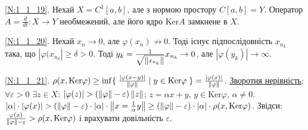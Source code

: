 \noindent\ref{N:1_1_19}. Нехай $X = C^1[a,b]$, але з нормою простору $C[a,b]=Y$.
Оператор $A = \frac{d}{dt}: X \to Y$ необмежений, але його ядро $\mathrm{Ker}A$
замкнене в $X$.

\noindent\ref{N:1_1_20}. Нехай $x_n \to 0$, але $\varphi(x_n) \not\to 0$.
Тоді існує підпослідовність $x_{n_k}$ така, що $|\varphi(x_{n_k}| \geq \delta > 0$.
Тоді $y_k = \frac{1}{\sqrt{\left\lVert x_{n_k}\right\rVert}} x_{n_k} \to 0$, але $|\varphi(y_k)|\to\infty$.

\noindent\ref{N:1_1_21}. $\rho(x,\mathrm{Ker}\varphi) \geq \inf
\{\; \frac{ |\varphi(x-y)| }{ \left\lVert\varphi\right\rVert } \mid y \in \mathrm{Ker}\varphi \;\} = 
\frac{|\varphi(x)|}{\left\lVert\varphi\right\rVert}$.
\uline{Зворотня нерівність}: $\forall\varepsilon > 0$ $\exists z \in X$:
$|\varphi(z)| > (\left\lVert\varphi\right\rVert - \varepsilon)\left\lVert z\right\rVert$;
$z = \alpha x + y$, $y \in \mathrm{Ker}\varphi$, $\alpha \neq 0$.
$|\alpha| \cdot |\varphi(x)|
> (\left\lVert\varphi\right\rVert - \varepsilon)\cdot|\alpha|\cdot\left\lVert x = \frac{1}{\alpha}y\right\rVert
\geq (\left\lVert\varphi\right\rVert - \varepsilon)\cdot|\alpha|\cdot\rho(x,\mathrm{Ker}\varphi)$.
Звідси: $\frac{\varphi(x)}{\left\lVert\varphi\right\rVert - \varepsilon} > \rho(x,\mathrm{Ker}\varphi)$
і врахувати довільність $\varepsilon$.

